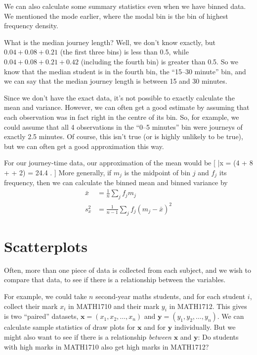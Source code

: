 \documentclass[
  letterpaper,
]{report}
\theoremstyle{definition}
\theoremstyle{definition}
\theoremstyle{remark}
\begin{document}
We can also calculate some summary statistics even when we have binned
data. We mentioned the mode earlier, where the modal bin is the bin of
highest frequency density.

What is the median journey length? Well, we don't know exactly, but
\(0.04 + 0.08 + 0.21\) (the first three bins) is less than 0.5, while
\(0.04 + 0.08 + 0.21 + 0.42\) (including the fourth bin) is greater than
0.5. So we know that the median student is in the fourth bin, the
``15--30 minute'' bin, and we can say that the median journey length is
between 15 and 30 minutes.

Since we don't have the exact data, it's not possible to exactly
calculate the mean and variance. However, we can often get a good
estimate by assuming that each observation was in fact right in the
centre of its bin. So, for example, we could assume that all 4
observations in the ``0--5 minutes'' bin were journeys of exactly 2.5
minutes. Of course, this isn't true (or is highly unlikely to be true),
but we can often get a good approximation this way.

For our journey-time data, our approximation of the mean would be {[}
\bar x =  \big(4 + 8  + \cdots +
2) = 24.4 . {]} More generally, if \(m_j\) is the midpoint of
bin \(j\) and \(f_j\) its frequency, then we can calculate the binned
mean and binned variance by \begin{align*}
  \bar x &= \frac{1}{n} \sum_j f_j m_j \\
  s^2_x  &= \frac{1}{n-1} \sum_j f_j (m_j - \bar x)^2
\end{align*}

\hypertarget{scatterplots}{%
\section{Scatterplots}\label{scatterplots}}

Often, more than one piece of data is collected from each subject, and
we wish to compare that data, to see if there is a relationship between
the variables.

For example, we could take \(n\) second-year maths students, and for
each student \(i\), collect their mark \(x_i\) in MATH1710 and their
mark \(y_i\) in MATH1712. This gives is two ``paired'' datasets,
\(\mathbf x = (x_1, x_2, \dots, x_n)\) and
\(\mathbf y = (y_1, y_2, \dots, y_n)\). We can calculate sample
statistics of draw plots for \(\mathbf x\) and for \(\mathbf y\)
individually. But we might also want to see if there is a relationship
\emph{between} \(\mathbf x\) and \(\mathbf y\): Do students with high
marks in MATH1710 also get high marks in MATH1712?
\end{document}
